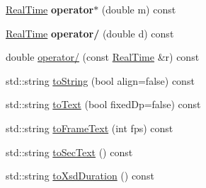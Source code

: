 \begin{DoxyCompactItemize}
\item 
\mbox{\label{struct_real_time_a7bc5c98d7174433ff1a53d0d9379e6aa}} 
\hyperlink{struct_real_time}{Real\+Time} {\bfseries operator$\ast$} (double m) const
\item 
\mbox{\label{struct_real_time_affc41ebd1db6d629bc5d4b8f851d3352}} 
\hyperlink{struct_real_time}{Real\+Time} {\bfseries operator/} (double d) const
\item 
double \hyperlink{struct_real_time_a0490b364a90dc60f3ad43f7d03787bd9}{operator/} (const \hyperlink{struct_real_time}{Real\+Time} \&r) const
\item 
std\+::string \hyperlink{struct_real_time_a14de8a0e61b2c5fdca62cd0c7c69130f}{to\+String} (bool align=false) const
\item 
std\+::string \hyperlink{struct_real_time_a5696e68ee181c45d25620e51c134d283}{to\+Text} (bool fixed\+Dp=false) const
\item 
std\+::string \hyperlink{struct_real_time_a0e6101f57c3255646ad653726ee54b10}{to\+Frame\+Text} (int fps) const
\item 
std\+::string \hyperlink{struct_real_time_a439bc705afe0dc850a05a251c8b72401}{to\+Sec\+Text} () const
\item 
std\+::string \hyperlink{struct_real_time_ab21fab249ec4d6264dcc18cbe1f1e343}{to\+Xsd\+Duration} () const
\end{DoxyCompactItemize}
